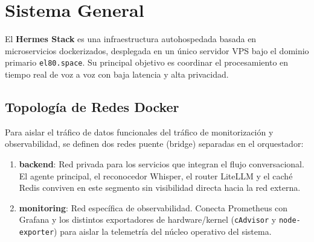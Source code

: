 \documentclass[12pt,a4paper,openany]{book}
\newcommand{\service}[1]{\textbf{\textsf{\color{hermesblue}#1}}}
\newcommand{\code}[1]{\texttt{\small#1}}
\newcommand{\domain}[1]{\texttt{\color{hermesblue}#1}}
\begin{document}
\chapter{Sistema General}
El \service{Hermes Stack} es una infraestructura autohospedada basada en microservicios dockerizados, desplegada en un único servidor VPS bajo el dominio primario \domain{el80.space}. Su principal objetivo es coordinar el procesamiento en tiempo real de voz a voz con baja latencia y alta privacidad.

\section{Topología de Redes Docker}
Para aislar el tráfico de datos funcionales del tráfico de monitorización y observabilidad, se definen dos redes puente (bridge) separadas en el orquestador:
\begin{enumerate}
    \item \textbf{backend}: Red privada para los servicios que integran el flujo conversacional. El agente principal, el reconocedor Whisper, el router LiteLLM y el caché Redis conviven en este segmento sin visibilidad directa hacia la red externa.
    \item \textbf{monitoring}: Red específica de observabilidad. Conecta Prometheus con Grafana y los distintos exportadores de hardware/kernel (\code{cAdvisor} y \code{node-exporter}) para aislar la telemetría del núcleo operativo del sistema.
\end{enumerate}
\end{document}
